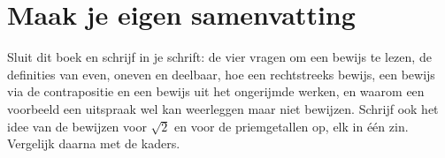 
\begin{oefeningen}

\end{oefeningen}


\begin{oefeningen}






\end{oefeningen}


\ifzelfstudie
\section*{Maak je eigen samenvatting}
Sluit dit boek en schrijf in je schrift: de vier vragen om een bewijs te lezen, de definities van even, oneven en deelbaar, hoe een rechtstreeks bewijs, een bewijs via de contrapositie en een bewijs uit het ongerijmde werken, en waarom een voorbeeld een uitspraak wel kan weerleggen maar niet bewijzen. Schrijf ook het idee van de bewijzen voor $\sqrt2$ en voor de priemgetallen op, elk in één zin. Vergelijk daarna met de kaders.
\fi
